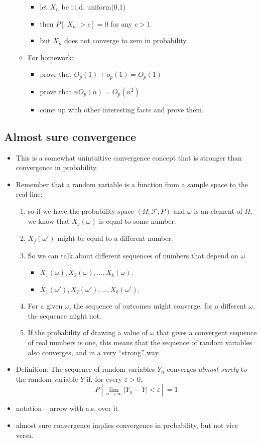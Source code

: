 \begin{itemize}
\begin{itemize}
\begin{itemize}
\item let $X_n$ be i.i.d. uniform(0,1)
\item then $P[|X_n| > c]  = 0$ for any $c > 1$
\item but $X_n$ does not converge to zero in probability.
\end{itemize}
\item For homework:
\begin{itemize}
\item prove that $O_p(1) + o_p(1) = O_p(1)$
\item prove that $n O_p(n) = O_p(n^2)$
\item come up with other interesting facts and prove them.
\end{itemize}
\end{itemize}
\end{itemize}
\subsection{Almost sure convergence}
\label{sec-1-5}

\begin{itemize}
\item This is a somewhat unintuitive convergence concept that is stronger
        than convergence in probability.
\item Remember that a random variable is a function from a sample space
        to the real line;
\begin{enumerate}
\item so if we have the probability space $(\Omega,
           \mathcal F, P)$ and $\omega$ is an element of $\Omega$, we know
           that $X_j(\omega)$ is equal to some number.
\item $X_j(\omega')$ might be equal to a different number.
\item So we can talk about different sequences of numbers that
           depend on $\omega$
\begin{itemize}
\item $X_1(\omega), X_2(\omega), \dots, X_k(\omega)$.
\item $X_1(\omega'), X_2(\omega'), \dots, X_k(\omega')$.
\end{itemize}
\item For a given $\omega$, the sequence of outcomes might
           converge, for a different $\omega$, the sequence might not.
\item If the probability of drawing a value of $\omega$ that gives a
           convergent sequence of real numbers is one, this means that
           the sequence of random variables also converges, and in a very
           ``strong'' way.
\end{enumerate}
\item Definition: The sequence of random variables $Y_n$ converges
        \emph{almost surely} to the random variable $Y$ if, for every
        $\varepsilon > 0$, \[ P[\lim_{n \to \infty} | Y_n - Y | <
        \varepsilon] = 1 \]
\item notation -- arrow with a.s. over it
\item almost sure convergence implies convergence in probability, but
        not vice versa.
\end{itemize}
